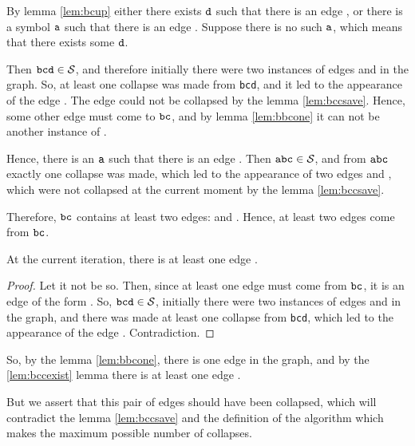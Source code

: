 By lemma \ref{lem:bcup} either there exists $ {\tt d} $ such that there is an edge , or there is a symbol $ {\tt a} $ such that there is an edge . Suppose there is no such $ {\tt a} $, which means that there exists some $ {\tt d} $.

Then $ {\tt bcd} \in {\cal S} $, and therefore initially there were two instances of edges  and  in the graph. So, at least one collapse was made from {\tt bcd}, and it led to the appearance of the edge . The edge  could not be collapsed by the lemma \ref{lem:bccsave}. Hence, some other edge must come to $ {\tt bc} $, and by lemma \ref{lem:bbcone} it can not be another instance of .

Hence, there is an $ {\tt a} $ such that there is an edge . Then $ {\tt abc} \in {\cal S} $, and from $ {\tt abc} $ exactly one collapse was made, which led to the appearance of two edges  and , which were not collapsed at the current moment by the lemma \ref{lem:bccsave}.

Therefore, $ {\tt bc} $ contains at least two edges:  and . Hence, at least two edges come from $ {\tt bc} $.

\begin{lemma}
\label{lem:bccexist}
At the current iteration, there is at least one edge .
\end{lemma}
\begin{proof}
Let it not be so. Then, since at least one edge must come from $ {\tt bc} $, it is an edge of the form . So, $ {\tt bcd} \in {\cal S} $, initially there were two instances of edges  and  in the graph, and there was made at least one collapse from {\tt bcd}, which led to the appearance of the edge . Contradiction.
\end{proof}

So, by the lemma \ref{lem:bbcone}, there is one edge  in the graph, and by the \ref{lem:bccexist} lemma there is at least one edge .

But we assert that this pair of edges should have been collapsed, which will contradict the lemma \ref{lem:bccsave} and the definition of the algorithm which makes the maximum possible number of collapses.

